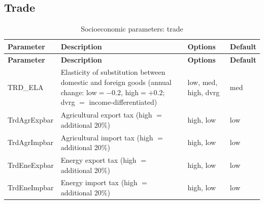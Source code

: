 \documentclass[10pt,a4paper,titlepage,dvipdfmx]{book}
\begin{document}
\subsection{Trade}
\begin{longtable}{|p{}|p{}|p{}|p{}|}
\caption{Socioeconomic parameters: trade}\label{tab:sp-soc-trade}\\
\hline
\textbf{Parameter} & \textbf{Description} & \textbf{Options} & \textbf{Default} \\ \hline
\endfirsthead
\hline
\textbf{Parameter} & \textbf{Description} & \textbf{Options} & \textbf{Default} \\ \hline
\endhead
\hline
\endfoot
TRD\_ELA & Elasticity of substitution between domestic and foreign goods (annual change: low$=-0.2$, high$=+0.2$; dvrg $=$ income-differentiated) & low, med, high, dvrg & med \\ \hline
TrdAgrExpbar & Agricultural export tax (high $=$ additional 20\%) & high, low & low \\ \hline
TrdAgrImpbar & Agricultural import tax (high $=$ additional 20\%) & high, low & low \\ \hline
TrdEneExpbar & Energy export tax (high $=$ additional 20\%) & high, low & low \\ \hline
TrdEneImpbar & Energy import tax (high $=$ additional 20\%) & high, low & low \\ \hline
\end{longtable}
\end{document}
